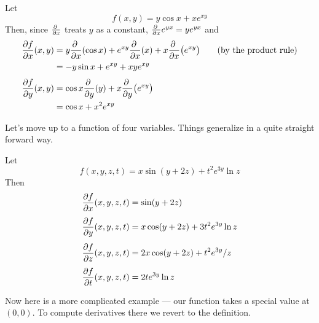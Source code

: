 \begin{eg}\label{eg partials B}
Let
\begin{equation*}
f(x,y) = y\cos x + xe^{xy}
\end{equation*}
Then, since $\pdiff{}{x}$ treats $y$ as a constant,
$\pdiff{}{x} e^{yx}=y e^{yx}$ and
\begin{align*}
\pdiff{f}{x}(x,y) &= y\pdiff{}{x}(\cos x) + e^{xy}\pdiff{}{x}(x) 
                         +x\pdiff{}{x}\big(e^{xy}\big)
                         \qquad\text{(by the product rule)} \\
                  &= -y\sin x + e^{xy} +xye^{xy} \\[0.05in]
\pdiff{f}{y}(x,y) &= \cos x\pdiff{}{y}(y) + x\pdiff{}{y}\big(e^{xy}\big) \\
                  &= \cos x + x^2e^{xy}
\end{align*}
\end{eg}
Let's move up to a function of four variables. Things generalize
in a quite straight forward way. 
\begin{eg}\label{eg partials C}
Let
\begin{equation*}
f(x,y,z,t) = x\sin(y+2z) +t^2e^{3y}\ln z
\end{equation*}
Then
\begin{align*}
\pdiff{f}{x}(x,y,z,t) &= \sin(y+2z)  \\[0.05in]
\pdiff{f}{y}(x,y,z,t) &= x\cos(y+2z) +3t^2e^{3y}\ln z \\[0.05in]
\pdiff{f}{z}(x,y,z,t) &= 2x\cos(y+2z) +t^2e^{3y}/z \\[0.05in]
\pdiff{f}{t}(x,y,z,t) &= 2te^{3y}\ln z 
\end{align*}
\end{eg}
Now here is a more complicated example --- our function takes a special
value at $(0,0)$. To compute derivatives there we revert to
the definition.
